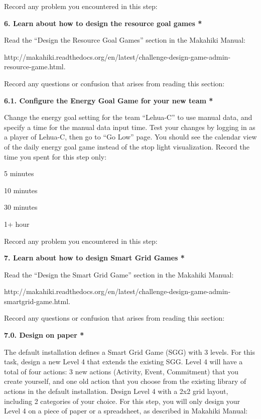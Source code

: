 Record any problem you encountered in this step: \underline{\hspace{4cm}}

{\bf 6. Learn about how to design the resource goal games *}

Read the ``Design the Resource Goal Games'' section in the Makahiki Manual:

http://makahiki.readthedocs.org/en/latest/challenge-design-game-admin-resource-game.html. 

Record any questions or confusion that arises from reading this section: \underline{\hspace{4cm}}

{\bf 6.1. Configure the Energy Goal Game for your new team *}

Change the energy goal setting for the team ``Lehua-C'' to use manual data, and specify a time for the manual data input time. Test your changes by logging in as a player of Lehua-C, then go to ``Go Low'' page. You should see the calendar view of the daily energy goal game instead of the stop light visualization. Record the time you spent for this step only:

\begin{radiobutton}
\item 5 minutes
\item  10 minutes
\item  30 minutes
\item  1+ hour
\end{radiobutton}

Record any problem you encountered in this step: \underline{\hspace{4cm}}

{\bf 7. Learn about how to design Smart Grid Games *}

Read the ``Design the Smart Grid Game'' section in the Makahiki Manual:

http://makahiki.readthedocs.org/en/latest/challenge-design-game-admin-smartgrid-game.html. 

Record any questions or confusion that arises from reading this section: \underline{\hspace{3cm}}

{\bf 7.0. Design on paper *}

The default installation defines a Smart Grid Game (SGG) with 3 levels. For this task, design a new Level 4 that extends the existing SGG. Level 4 will have a total of four actions: 3 new actions (Activity, Event, Commitment) that you create yourself, and one old action that you choose from the existing library of actions in the default installation. Design Level 4 with a 2x2 grid layout, including 2 categories of your choice. For this step, you will only design your Level 4 on a piece of paper or a spreadsheet, as described in Makahiki Manual:

